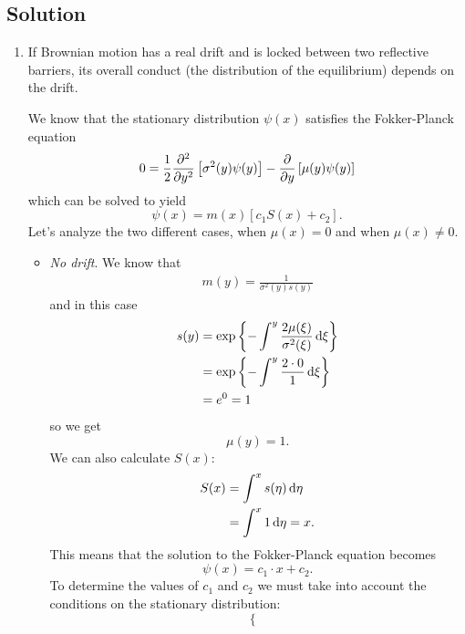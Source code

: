 \documentclass[12pt]{article}
\begin{document}
	\subsection*{Solution}
	\begin{enumerate}
		\item If Brownian motion has a real drift and is locked between two reflective barriers, its overall conduct (the distribution of the equilibrium) depends on the drift. \par
		We know that the stationary distribution $\psi(x)$ satisfies the Fokker-Planck equation
		\begin{equation*}
			0=\frac{1}{2}\frac{\partial^{2}}{\partial y^{2}}\left[\sigma^{2}(y)\psi(y)\right]-\frac{\partial}{\partial y}\left[\mu(y)\psi(y)\right]
		\end{equation*} which can be solved to yield
		\begin{equation*}
			\psi(x)=m(x)\left[c_{1}S(x)+c_{2}\right].
		\end{equation*}
		Let's analyze the two different cases, when $\mu(x)=0$ and when $\mu(x)\neq0$.
		\begin{itemize}
			\item \emph{No drift}. We know that
				\begin{align*}
				m(y)=\frac{1}{\sigma^{2}(y)s(y)}
			\end{align*}
			and in this case
			\begin{align*}
				s(y)&=\exp\left\{-\int^{y}\frac{2\mu(\xi)}{\sigma^{2}(\xi)}\mathop{}\!\mathrm{d}\xi\right\}\\
				&=\exp\left\{-\int^{y}\frac{2\cdot 0}{1}\mathop{}\!\mathrm{d}\xi\right\}\\
				&=e^{0}=1
			\end{align*}
			so we get
			\begin{equation*}
				\mu(y)=1.
			\end{equation*}
			We can also calculate $S(x):$
			\begin{align*}
					S(x)&=\int^{x}s(\eta)\mathop{}\!\mathrm{d}\eta\\
					&=\int^{x}1\mathop{}\!\mathrm{d}\eta=x.
			\end{align*}
			This means that the solution to the Fokker-Planck equation becomes
			\begin{equation*}
				\psi(x)=c_{1}\cdot x+c_{2}.
			\end{equation*}
			To determine the values of $c_{1}$ and $c_{2}$ we must take into account the conditions on the stationary distribution:
			\begin{equation*}
				\begin{cases}

\end{cases}
\end{equation*}
\end{itemize}
\end{enumerate}
\end{document}
